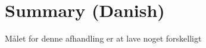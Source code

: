 \chapter{Summary (Danish)}
\begin{otherlanguage}{danish}

Målet for denne afhandling er at lave noget forskelligt

\end{otherlanguage}